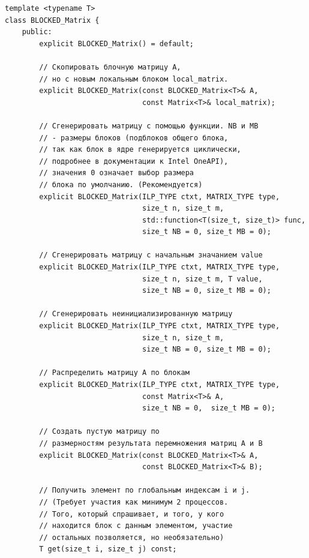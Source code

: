 \documentclass[12pt,fleqn]{article}
\begin{document}
        \begin{mdframed}[linecolor=black, topline=true, bottomline=true,
            leftline=false, rightline=false]
        \begin{verbatim}
template <typename T>
class BLOCKED_Matrix {
    public:
        explicit BLOCKED_Matrix() = default;

        // Скопировать блочную матрицу А,
        // но с новым локальным блоком local_matrix.
        explicit BLOCKED_Matrix(const BLOCKED_Matrix<T>& A, 
                                const Matrix<T>& local_matrix);

        // Сгенерировать матрицу с помощью функции. NB и MB 
        // - размеры блоков (подблоков общего блока, 
        // так как блок в ядре генерируется циклически, 
        // подробнее в документации к Intel OneAPI), 
        // значения 0 означает выбор размера 
        // блока по умолчанию. (Рекомендуется)
        explicit BLOCKED_Matrix(ILP_TYPE ctxt, MATRIX_TYPE type, 
                                size_t n, size_t m, 
                                std::function<T(size_t, size_t)> func, 
                                size_t NB = 0, size_t MB = 0);

        // Сгенерировать матрицу с начальным значанием value
        explicit BLOCKED_Matrix(ILP_TYPE ctxt, MATRIX_TYPE type, 
                                size_t n, size_t m, T value, 
                                size_t NB = 0, size_t MB = 0);

        // Сгенерировать неинициализированную матрицу
        explicit BLOCKED_Matrix(ILP_TYPE ctxt, MATRIX_TYPE type, 
                                size_t n, size_t m, 
                                size_t NB = 0, size_t MB = 0);

        // Распределить матрицу А по блокам
        explicit BLOCKED_Matrix(ILP_TYPE ctxt, MATRIX_TYPE type, 
                                const Matrix<T>& A, 
                                size_t NB = 0,  size_t MB = 0);

        // Создать пустую матрицу по
        // размерностям результата перемножения матриц A и B
        explicit BLOCKED_Matrix(const BLOCKED_Matrix<T>& A, 
                                const BLOCKED_Matrix<T>& B);

        // Получить элемент по глобальным индексам i и j. 
        // (Требует участия как минимум 2 процессов. 
        // Того, который спрашивает, и того, у кого 
        // находится блок с данным элементом, участие 
        // остальных позволяется, но необязательно)
        T get(size_t i, size_t j) const;


\end{verbatim}
\end{mdframed}
\end{document}

